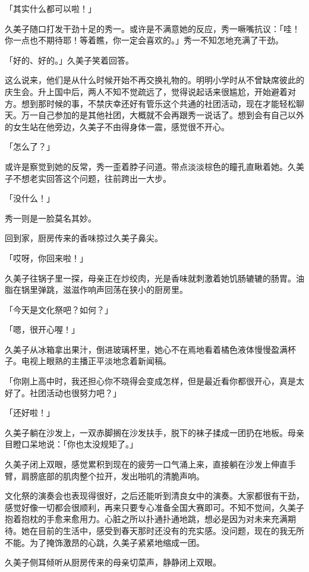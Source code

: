 \documentclass[UTF8]{ctexart}
\begin{document}
    「其实什么都可以啦！」 

    久美子随口打发干劲十足的秀一。或许是不满意她的反应，秀一噘嘴抗议：「哇！你一点也不期待耶！等着瞧，你一定会喜欢的。」秀一不知怎地充满了干劲。 

    「好的、好的。」久美子笑着回答。 

    这么说来，他们是从什么时候开始不再交换礼物的。明明小学时从不曾缺席彼此的庆生会。升上国中后，两人不知不觉疏远了，觉得说起话来很尴尬，开始避着对方。想到那时候的事，不禁庆幸还好有管乐这个共通的社团活动，现在才能轻松聊天。万一自己参加的是其他社团，大概就不会再跟秀一说话了。想到会有自己以外的女生站在他旁边，久美子不由得身体一震，感觉很不开心。 

    「怎么了？」 

    或许是察觉到她的反常，秀一歪着脖子问道。带点淡淡棕色的瞳孔直瞅着她。久美子不想老实回答这个问题，往前跨出一大步。 

    「没什么！」 

    秀一则是一脸莫名其妙。 

    回到家，厨房传来的香味掠过久美子鼻尖。 

    「哎呀，你回来啦！」 

    久美子往锅子里一探，母亲正在炒绞肉，光是香味就刺激着她饥肠辘辘的肠胃。油脂在锅里弹跳，滋滋作响声回荡在狭小的厨房里。 

    「今天是文化祭吧？如何？」 

    「嗯，很开心喔！」 

    久美子从冰箱拿出果汁，倒进玻璃杯里，她心不在焉地看着橘色液体慢慢盈满杯子。电视上眼熟的主播正平淡地念着新闻稿。 

    「你刚上高中时，我还担心你不晓得会变成怎样，但是最近看你都很开心，真是太好了。社团活动也很努力吧？」 

    「还好啦！」 

    久美子躺在沙发上，一双赤脚搁在沙发扶手，脱下的袜子揉成一团扔在地板。母亲目瞪口呆地说：「你也太没规矩了。」 

    久美子闭上双眼，感觉累积到现在的疲劳一口气涌上来，直接躺在沙发上伸直手臂，肩膀底部的肌肉整个拉开，发出啪叽的清脆声响。 

    文化祭的演奏会也表现得很好，之后还能听到清良女中的演奏。大家都很有干劲，感觉好像一切都会很顺利，再来只要专心准备全国大赛即可。不知不觉间，久美子抱着抱枕的手愈来愈用力。心脏之所以扑通扑通地跳，想必是因为对未来充满期待。她在目前的生活中，感受到春天那时还没有的充实感。没问题，现在的我无所不能。为了掩饰激昂的心跳，久美子紧紧地缩成一团。 

    久美子侧耳倾听从厨房传来的母亲切菜声，静静闭上双眼。 
\end{document}
